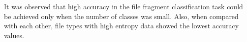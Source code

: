 It was observed that high accuracy in the file fragment classification task could be achieved only when the number of classes was small. Also, when compared with each other, file types with high entropy data showed the lowest accuracy values.
